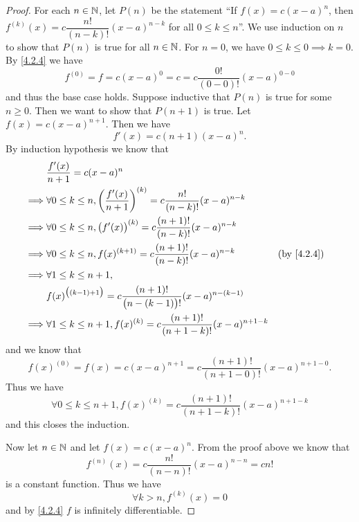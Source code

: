 \begin{proof}
  For each \(n \in \mathbb{N}\), let \(P(n)\) be the statement ``If \(f(x) = c (x - a)^n\), then \(f^{(k)}(x) = c \dfrac{n!}{(n - k)!} (x - a)^{n - k}\) for all \(0 \leq k \leq n\)''.
  We use induction on \(n\) to show that \(P(n)\) is true for all \(n \in \mathbb{N}\).
  For \(n = 0\), we have \(0 \leq k \leq 0 \implies k = 0\).
  By \cref{4.2.4} we have
  \[
    f^{(0)} = f = c (x - a)^0 = c = c \dfrac{0!}{(0 - 0)!} (x - a)^{0 - 0}
  \]
  and thus the base case holds.
  Suppose inductive that \(P(n)\) is true for some \(n \geq 0\).
  Then we want to show that \(P(n + 1)\) is true.
  Let \(f(x) = c (x - a)^{n + 1}\).
  Then we have
  \[
    f'(x) = c (n + 1) (x - a)^n.
  \]
  By induction hypothesis we know that
  \begin{align*}
             & \dfrac{f'(x)}{n + 1} = c (x - a)^n                                                                                       \\
    \implies & \forall 0 \leq k \leq n, \bigg(\dfrac{f'(x)}{n + 1}\bigg)^{(k)} = c \dfrac{n!}{(n - k)!} (x - a)^{n - k}                 \\
    \implies & \forall 0 \leq k \leq n, \big(f'(x)\big)^{(k)} = c \dfrac{(n + 1)!}{(n - k)!} (x - a)^{n - k}                            \\
    \implies & \forall 0 \leq k \leq n, f(x)^{(k + 1)} = c \dfrac{(n + 1)!}{(n - k)!} (x - a)^{n - k}                   &  & \by{4.2.4} \\
    \implies & \forall 1 \leq k \leq n + 1,                                                                                             \\
             & f(x)^{\big((k - 1) + 1\big)} = c \dfrac{(n + 1)!}{\big(n - (k - 1)\big)!} (x - a)^{n - (k - 1)}                          \\
    \implies & \forall 1 \leq k \leq n + 1, f(x)^{(k)} = c \dfrac{(n + 1)!}{(n + 1 - k)!} (x - a)^{n + 1 - k}
  \end{align*}
  and we know that
  \[
    f(x)^{(0)} = f(x) = c (x - a)^{n + 1} = c \dfrac{(n + 1)!}{(n + 1 - 0)!} (x - a)^{n + 1 - 0}.
  \]
  Thus we have
  \[
    \forall 0 \leq k \leq n + 1, f(x)^{(k)} = c \dfrac{(n + 1)!}{(n + 1 - k)!} (x - a)^{n + 1 - k}
  \]
  and this closes the induction.

  Now let \(n \in \mathbb{N}\) and let \(f(x) = c (x - a)^n\).
  From the proof above we know that
  \[
    f^{(n)}(x) = c \dfrac{n!}{(n - n)!} (x - a)^{n - n} = c n!
  \]
  is a constant function.
  Thus we have
  \[
    \forall k > n, f^{(k)}(x) = 0
  \]
  and by \cref{4.2.4} \(f\) is infinitely differentiable.
\end{proof}

